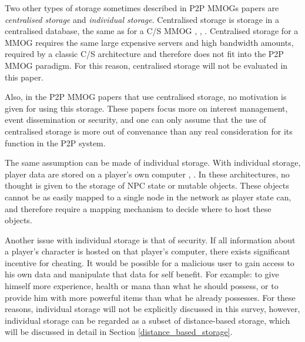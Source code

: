 \documentclass[10pt,a4paper,journal,cspaper,compsoc]{IEEEtran}
\begin{document}
Two other types of storage sometimes described in P2P MMOGs papers are \emph{centralised storage} and \emph{individual storage}. Centralised storage
is storage in a centralised database, the same as for a C/S MMOG \cite{badumna_engine}, \cite{rooney_centralised_storage},
\cite{hybrid_p2p_cs_centralised}. Centralised storage for a MMOG requires the same large expensive servers and high bandwidth amounts, required by a
classic C/S architecture and therefore does not fit into the P2P MMOG paradigm. For this reason, centralised storage will not be evaluated in this
paper.

Also, in the P2P MMOG papers that use centralised storage, no motivation is given for using this storage. These papers focus more on interest
management, event dissemination or security, and one can only assume that the use of centralised storage is more out of convenance than any real
consideration for its function in the P2P system.

The same assumption can be made of individual storage. With individual storage, player data are stored on a player's own computer
\cite{individual_storage1}, \cite{cheat_proof_playout}. In these architectures, no thought is given to the storage of NPC state or mutable objects.
These objects cannot be as easily mapped to a single node in the network as player state can, and therefore require a mapping mechanism to decide
where to host these objects.

Another issue with individual storage is that of security. If all information about a player's character is hosted on that player's computer, there
exists significant incentive for cheating. It would be possible for a malicious user to gain access to his own data and manipulate that data for self
benefit. For example: to give himself more experience, health or mana than what he should possess, or to provide him with more powerful items than
what he already possesses. For these reasons, individual storage will not be explicitly discussed in this survey, however, individual storage can be
regarded as a subset of distance-based storage, which will be discussed in detail in Section \ref{distance_based_storage}.
\end{document}
